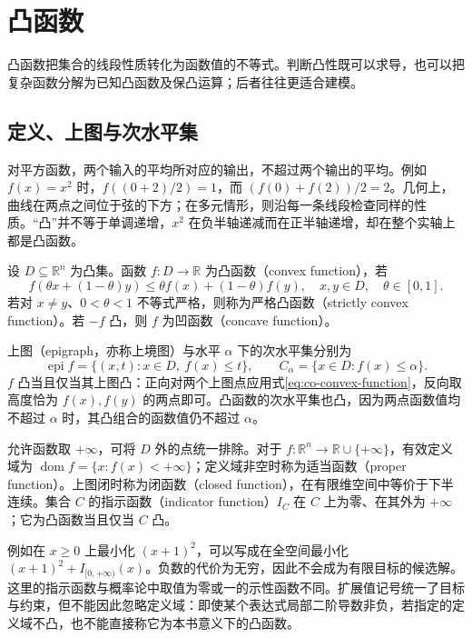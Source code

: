 \setcounter{chapter}{2} %
\chapter{凸函数}
\label{ch:co-functions}

凸函数把集合的线段性质转化为函数值的不等式。判断凸性既可以求导，也可以把复杂函数分解为已知凸函数及保凸运算；后者往往更适合建模。

\section{定义、上图与次水平集}

对平方函数，两个输入的平均所对应的输出，不超过两个输出的平均。例如 $f(x)=x^2$ 时，$f((0+2)/2)=1$，而 $(f(0)+f(2))/2=2$。几何上，曲线在两点之间位于弦的下方；在多元情形，则沿每一条线段检查同样的性质。“凸”并不等于单调递增，$x^2$ 在负半轴递减而在正半轴递增，却在整个实轴上都是凸函数。

\begin{definition}
设 $D\subseteq\mathbb R^n$ 为凸集。函数 $f:D\to\mathbb R$ 为凸函数（convex function），若
\begin{equation}
 f(\theta x+(1-\theta)y)\leq\theta f(x)+(1-\theta)f(y),
 \quad x,y\in D,\quad\theta\in[0,1].
 \label{eq:co-convex-function}
\end{equation}
若对 $x\ne y$、$0<\theta<1$ 不等式严格，则称为严格凸函数（strictly convex function）。若 $-f$ 凸，则 $f$ 为凹函数（concave function）。
\end{definition}

上图（epigraph，亦称上境图）与水平 $\alpha$ 下的次水平集分别为
\[
 \operatorname{epi}f=\{(x,t):x\in D,\ f(x)\leq t\},\qquad
 C_\alpha=\{x\in D:f(x)\leq\alpha\}.
\]
$f$ 凸当且仅当其上图凸：正向对两个上图点应用式\eqref{eq:co-convex-function}，反向取高度恰为 $f(x),f(y)$ 的两点即可。凸函数的次水平集也凸，因为两点函数值均不超过 $\alpha$ 时，其凸组合的函数值仍不超过 $\alpha$。

允许函数取 $+\infty$，可将 $D$ 外的点统一排除。对于 $f:\mathbb R^n\to\mathbb R\cup\{+\infty\}$，有效定义域为 $\operatorname{dom}f=\{x:f(x)<+\infty\}$；定义域非空时称为适当函数（proper function）。上图闭时称为闭函数（closed function），在有限维空间中等价于下半连续。集合 $C$ 的指示函数（indicator function）$I_C$ 在 $C$ 上为零、在其外为 $+\infty$；它为凸函数当且仅当 $C$ 凸。

例如在 $x\geq0$ 上最小化 $(x+1)^2$，可以写成在全空间最小化 $(x+1)^2+I_{[0,+\infty)}(x)$。负数的代价为无穷，因此不会成为有限目标的候选解。这里的指示函数与概率论中取值为零或一的示性函数不同。扩展值记号统一了目标与约束，但不能因此忽略定义域：即使某个表达式局部二阶导数非负，若指定的定义域不凸，也不能直接称它为本书意义下的凸函数。

